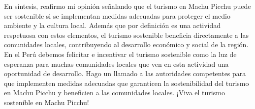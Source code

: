 \documentclass{article}
\begin{document}
En síntesis, reafirmo mi opinión señalando que el turismo en Machu Picchu puede ser sostenible si se implementan medidas adecuadas para proteger el medio ambiente y la cultura local. Además que por definición es una actividad respetuosa con estos elementos, el turismo sostenible beneficia directamente a las comunidades locales, contribuyendo al desarrollo económico y social de la región. En el Perú debemos felicitar e incentivar el turismo sostenible como la luz de esperanza para muchas comunidades locales que ven en esta actividad una oportunidad de desarrollo. Hago un llamado a las autoridades competentes para que implementen medidas adecuadas que garanticen la sostenibilidad del turismo en Machu Picchu y beneficien a las comunidades locales. ¡Viva el turismo sostenible en Machu Picchu!



  
\end{document}
